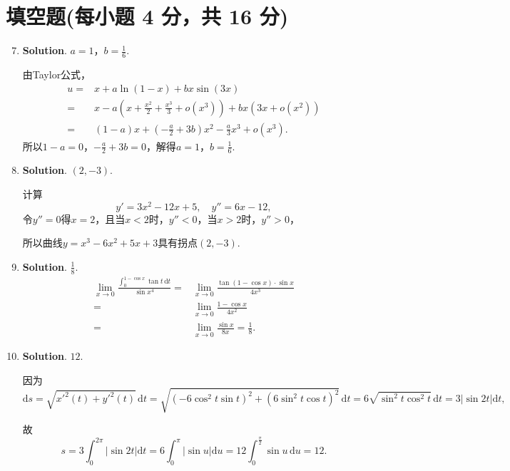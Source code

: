 \documentclass[../main.tex]{subfiles}
\begin{document}
\section{填空题(每小题 4 分，共 16 分)}
\begin{enumerate}
    \setcounter{enumi}{6}
    \item \textbf{Solution}. $a=1$，$b=\frac{1}{6}$.

          由Taylor公式，
          \[
              \begin{aligned}
                  u = {} & x+a\ln(1-x)+bx\sin(3x)                                                            \\
                  = {}   & x-a\left(x+\frac{x^2}{2}+\frac{x^3}{3}+o(x^{3})\right)+bx\left(3x+o(x^{2})\right) \\
                  = {}   & (1-a)x+\left(-\frac{a}{2}+3b\right)x^{2}-\frac{a}{3}x^{3}+o(x^{3}).
              \end{aligned}
          \]
          所以$1-a=0$，$-\frac{a}{2}+3b=0$，解得$a=1$，$b=\frac{1}{6}$.

    \item \textbf{Solution}. $(2,-3)$.

          计算
          \[
              y'=3x^{2}-12x+5,\quad y''=6x-12,
          \]
          令$y''=0$得$x=2$，且当$x<2$时，$y''<0$，当$x>2$时，$y''>0$，

          所以曲线$y=x^{3}-6x^{2}+5x+3$具有拐点$(2,-3)$.

    \item \textbf{Solution}. $\frac{1}{8}$.
          \[
              \begin{aligned}
                  \lim_{x\to0}\frac{\displaystyle\int_{0}^{1-\cos x}\tan t\,\mathrm{d}t}{\sin x^4}= {} & \lim_{x\to0}\frac{\tan(1-\cos x)\cdot \sin x}{4x^3} \\
                  = {}                                                                                 & \lim_{x\to0}\frac{1-\cos x}{4x^2}                   \\
                  = {}                                                                                 & \lim_{x\to0}\frac{\sin x}{8x}= \frac{1}{8}.
              \end{aligned}
          \]

    \item \textbf{Solution}. $12$.

          因为
          \[
              \mathrm{d}s=\sqrt{x'^{2}(t)+y'^{2}(t)}\,\mathrm{d}t=\sqrt{(-6\cos^{2} t\sin
                  t)^{2}+(6\sin^{2} t\cos t)^{2}}\,\mathrm{d}t=6\sqrt{\sin^{2} t\cos^{2} t}\,\mathrm{d}
              t=3|\sin 2t|\mathrm{d}t,
          \]

          故
          \[
              s=3\int_{0}^{2\pi}|\sin 2t|\mathrm{d}t=6\int_{0}^{\pi}|\sin u|\mathrm{d}
              u=12\int_{0}^{\frac{\pi}{2}}\sin u\,\mathrm{d}u=12.
          \]
\end{enumerate}
\end{document}
